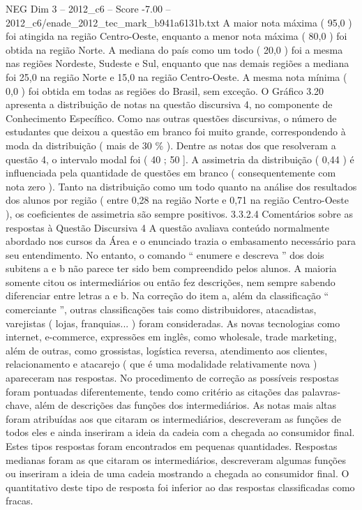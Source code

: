 \begin{textsample}{NEG Dim 3 – 2012\_c6 – Score -7.00 – 2012\_c6/enade\_2012\_tec\_mark\_b941a6131b.txt}
A maior nota máxima ( 95,0 ) foi atingida na região Centro-Oeste, enquanto a menor nota máxima ( 80,0 ) foi obtida na região Norte.
A mediana do país como um todo ( 20,0 ) foi a mesma nas regiões Nordeste, Sudeste e Sul, enquanto que nas demais regiões a mediana foi 25,0 na região Norte e 15,0 na região Centro-Oeste.
A mesma nota mínima ( 0,0 ) foi obtida em todas as regiões do Brasil, sem exceção.
O Gráfico 3.20 apresenta a distribuição de notas na questão discursiva 4, no componente de Conhecimento Específico.
Como nas outras questões discursivas, o número de estudantes que deixou a questão em branco foi muito grande, correspondendo à moda da distribuição ( mais de 30 \% ).
Dentre as notas dos que resolveram a questão 4, o intervalo modal foi ( 40 ; 50 ].
A assimetria da distribuição ( 0,44 ) é influenciada pela quantidade de questões em branco ( consequentemente com nota zero ).
Tanto na distribuição como um todo quanto na análise dos resultados dos alunos por região ( entre 0,28 na região Norte e 0,71 na região Centro-Oeste ), os coeficientes de assimetria são sempre positivos. 3.3.2.4 Comentários sobre as respostas à Questão Discursiva 4 A questão avaliava conteúdo normalmente abordado nos cursos da Área e o enunciado trazia o embasamento necessário para seu entendimento.
No entanto, o comando “ enumere e descreva ” dos dois subitens a e b não parece ter sido bem compreendido pelos alunos.
A maioria somente citou os intermediários ou então fez descrições, nem sempre sabendo diferenciar entre letras a e b.
Na correção do item a, além da classificação “ comerciante ”, outras classificações tais como distribuidores, atacadistas, varejistas ( lojas, franquias... ) foram consideradas.
As novas tecnologias como internet, e-commerce, expressões em inglês, como wholesale, trade marketing, além de outras, como grossistas, logística reversa, atendimento aos clientes, relacionamento e atacarejo ( que é uma modalidade relativamente nova ) apareceram nas respostas.
No procedimento de correção as possíveis respostas foram pontuadas diferentemente, tendo como critério as citações das palavras-chave, além de descrições das funções dos intermediários.
As notas mais altas foram atribuídas aos que citaram os intermediários, descreveram as funções de todos eles e ainda inseriram a ideia da cadeia com a chegada ao consumidor final.
Estes tipos respostas foram encontrados em pequenas quantidades.
Respostas medianas foram as que citaram os intermediários, descreveram algumas funções ou inseriram a ideia de uma cadeia mostrando a chegada ao consumidor final.
O quantitativo deste tipo de resposta foi inferior ao das respostas classificadas como fracas.

\end{textsample}
